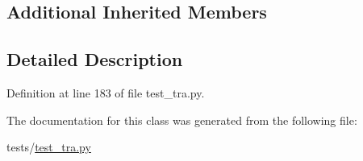 \subsection*{Additional Inherited Members}


\subsection{Detailed Description}


Definition at line 183 of file test\+\_\+tra.\+py.



The documentation for this class was generated from the following file\+:\begin{DoxyCompactItemize}
\item 
tests/\hyperlink{test__tra_8py}{test\+\_\+tra.\+py}\end{DoxyCompactItemize}
